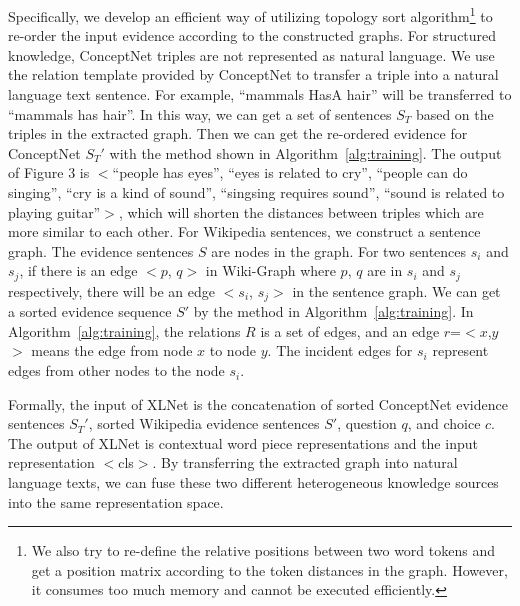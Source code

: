 \documentclass[letterpaper]{article} \usepackage{aaai20}  \usepackage{times}  \usepackage{helvet} \usepackage{courier}  \usepackage[hyphens]{url}  \usepackage{graphicx} \urlstyle{rm} \def\UrlFont{\rm}  \usepackage{graphicx}  \frenchspacing  \setlength{\pdfpagewidth}{8.5in}  \setlength{\pdfpageheight}{11in}
\begin{document}
Specifically, we develop an efficient way of utilizing topology sort algorithm\footnote{We also try to re-define the relative positions between two word tokens and get a position matrix according to the token distances in the graph. However, it consumes too much memory and cannot be executed efficiently.} to re-order the input evidence according to the constructed graphs. 
For structured knowledge, ConceptNet triples are not represented as natural language. We use the relation template provided by ConceptNet to transfer a triple into a natural language text sentence.
For example, ``mammals HasA hair'' will be transferred to ``mammals has hair''. In this way, we can get a set of sentences $S_T$ based on the triples in the extracted graph. Then we can get the re-ordered evidence  for  ConceptNet $S_T'$ with the method shown in Algorithm~\ref{alg:training}. The output of Figure 3 is $<$``people has eyes'', ``eyes is related to cry'', ``people can do singing'', ``cry is a kind of sound'', ``singsing requires sound'', ``sound is related to playing guitar''$>$, which will shorten the distances between triples which are more similar to each other.
For Wikipedia sentences, we construct a sentence graph. The evidence sentences $S$ are nodes in the graph. For two sentences $s_i$ and $s_j$, if there is an edge $<$$p$, $q$$>$ in Wiki-Graph where $p$, $q$ are in $s_i$ and $s_j$ respectively, there will be an edge $<$$s_i$, $s_j$$>$ in the sentence graph. We can get a sorted evidence sequence $S'$ by the method in Algorithm~\ref{alg:training}. In Algorithm~\ref{alg:training}, the relations $R$ is a set of edges, and an edge $r$=$<$$x$,$y$$>$ means the edge from node $x$ to node $y$. The incident edges for $s_i$ represent edges from other nodes to the node $s_i$.  

Formally, the input of XLNet is the concatenation of sorted ConceptNet evidence sentences $S_T'$, sorted Wikipedia evidence sentences $S'$,  question $q$, and choice $c$. The output of XLNet is contextual word piece representations and the input representation $<$cls$>$. By transferring the extracted graph into natural language texts, we can fuse these two different heterogeneous knowledge sources into the same representation space.
\end{document}
